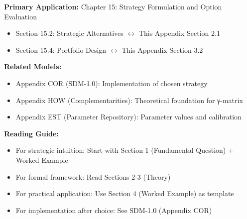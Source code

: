 %
%



\begin{tcolorbox}[colback=purple!5!white, colframe=purple!75!black,
    title=Chapter Linkage: Strategic Option Comparison]

\textbf{Primary Application:} Chapter 15: Strategy Formulation and Option Evaluation
\begin{itemize}[nosep]
\item Section 15.2: Strategic Alternatives $\leftrightarrow$ This Appendix Section 2.1
\item Section 15.4: Portfolio Design $\leftrightarrow$ This Appendix Section 3.2
\end{itemize}

\textbf{Related Models:}
\begin{itemize}[nosep]
\item Appendix COR (SDM-1.0): Implementation of chosen strategy
\item Appendix HOW (Complementarities): Theoretical foundation for γ-matrix
\item Appendix EST (Parameter Repository): Parameter values and calibration
\end{itemize}

\textbf{Reading Guide:}
\begin{itemize}[nosep]
\item For strategic intuition: Start with Section 1 (Fundamental Question) + Worked Example
\item For formal framework: Read Sections 2-3 (Theory)
\item For practical application: Use Section 4 (Worked Example) as template
\item For implementation after choice: See SDM-1.0 (Appendix COR)
\end{itemize}

\end{tcolorbox}

